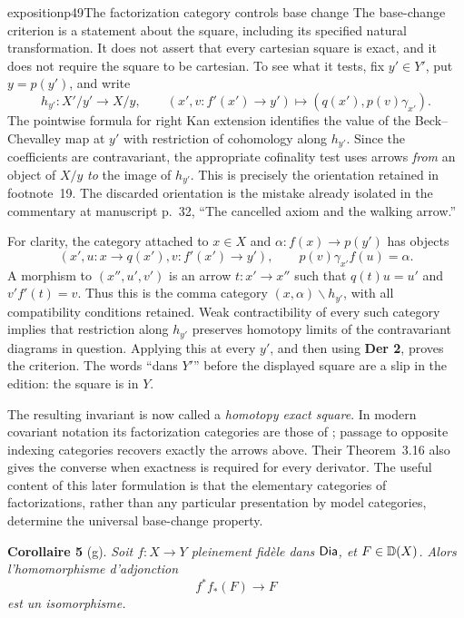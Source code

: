 \begin{dcomment}{exposition}{p49}{The factorization category controls base change}
The base-change criterion is a statement about the square, including its specified natural transformation. It does not assert that every cartesian square is exact, and it does not require the square to be cartesian. To see what it tests, fix $y'\in Y'$, put $y=p(y')$, and write
\[
 h_{y'}:X'/y'\longrightarrow X/y,
 \qquad (x',v:f'(x')\to y')\longmapsto
 (q(x'),p(v)\gamma_{x'}).
\]
The pointwise formula for right Kan extension identifies the value of the Beck--Chevalley map at $y'$ with restriction of cohomology along $h_{y'}$. Since the coefficients are contravariant, the appropriate cofinality test uses arrows \emph{from} an object of $X/y$ \emph{to} the image of $h_{y'}$. This is precisely the orientation retained in footnote~19. The discarded orientation is the mistake already isolated in the commentary at manuscript p.~32, ``The cancelled axiom and the walking arrow.''

For clarity, the category attached to $x\in X$ and $\alpha:f(x)\to p(y')$ has objects
\[
 (x',u:x\to q(x'),v:f'(x')\to y'),
 \qquad p(v)\gamma_{x'}f(u)=\alpha.
\]
A morphism to $(x'',u',v')$ is an arrow $t:x'\to x''$ such that $q(t)u=u'$ and $v'f'(t)=v$. Thus this is the comma category $(x,\alpha)\backslash h_{y'}$, with all compatibility conditions retained. Weak contractibility of every such category implies that restriction along $h_{y'}$ preserves homotopy limits of the contravariant diagrams in question. Applying this at every $y'$, and then using \textbf{Der 2}, proves the criterion. The words ``dans $Y'$'' before the displayed square are a slip in the edition: the square is in $Y$.

The resulting invariant is now called a \emph{homotopy exact square}. In modern covariant notation its factorization categories are those of \citet[Definition~3.7 and Theorem~3.8]{GrothPontoShulman2014}; passage to opposite indexing categories recovers exactly the arrows above. Their Theorem~3.16 also gives the converse when exactness is required for every derivator. The useful content of this later formulation is that the elementary categories of factorizations, rather than any particular presentation by model categories, determine the universal base-change property.
\end{dcomment}


\noindent\textbf{Corollaire 5} (g). \textit{Soit $f : X \to Y$ pleinement fidèle dans} $\mathsf{Dia}$\textit{, et $F \in \mathbb{D}(X)$. Alors l'homomorphisme d'adjonction}
\[ f^{*} f_{*}(F) \longrightarrow F \]
\textit{est un isomorphisme.}

